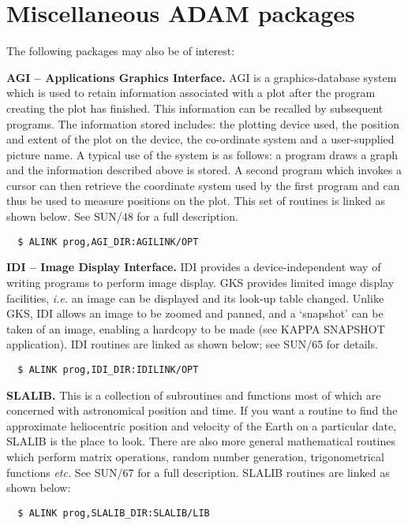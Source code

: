 \documentclass[twoside,11pt]{article}
\renewcommand{\_}{{\tt\char'137}}
\newcommand{\xref}[3]{#1}
\newcommand{\xlabel}[1]{}
\begin{document}
\newpage
\section{Miscellaneous ADAM packages\label{misc}\xlabel{miscellaneous_adam_packages}}

The following packages may also be of interest:
\begin{description}
\item{\bf AGI -- Applications Graphics Interface.} AGI is a graphics-database 
system  which is used to retain information associated with a plot after the
program creating the plot has finished. This information can be recalled 
by subsequent programs.
The information stored includes: the plotting device used, 
the position  and extent of the plot on the device, the 
co-ordinate system and a user-supplied picture name.
A typical use of the system is as follows: a program draws a graph
and the information described above is stored.
A second program which invokes a cursor 
can then retrieve the coordinate system used by the first
program and can thus be used to measure positions on the plot.
This set of routines is linked as shown below.
See \xref{SUN/48}{sun48}{} for a full description.
\begin{verbatim}
  $ ALINK prog,AGI_DIR:AGILINK/OPT
\end{verbatim}

\item{\bf IDI -- Image Display Interface.} 
IDI provides a device-independent way of writing programs to perform 
image display. 
GKS provides limited image display facilities, {\it i.e.} an image can be 
displayed  and  its look-up table changed.
Unlike GKS, IDI allows an image to be zoomed and panned, and a 
`snapshot' can be taken of an image, enabling a hardcopy to be made 
(see KAPPA SNAPSHOT application).
IDI routines are linked as shown below; see \xref{SUN/65}{sun65}{} for details.
\begin{verbatim}
  $ ALINK prog,IDI_DIR:IDILINK/OPT
\end{verbatim}
 
\item{\bf SLALIB.} This is a collection of subroutines and functions
most of which are concerned with astronomical position and time.
If you want a routine to find the approximate heliocentric position and 
velocity of the Earth on a particular date, SLALIB is the place to look.
There are also more general mathematical routines which perform
matrix operations, random number generation, trigonometrical functions
{\it etc.}
See \xref{SUN/67}{sun67}{} for a full description.
SLALIB routines are linked as shown below:
\begin{verbatim}
  $ ALINK prog,SLALIB_DIR:SLALIB/LIB
\end{verbatim}


\end{description}
\end{document}
